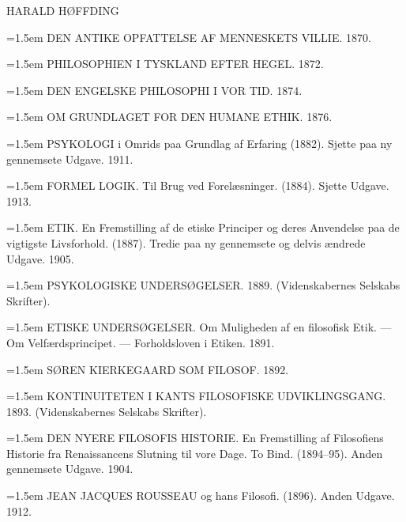 \documentclass[12pt,a4paper,openany]{book}
\begin{document}
\begin{center}
{\large HARALD HØFFDING}
\end{center}
\medskip
\begin{footnotesize}
\setlength{\parindent}{0pt}\setlength{\parskip}{1pt}
\hangindent=1.5em DEN ANTIKE OPFATTELSE AF MENNESKETS VILLIE. 1870.\par
\hangindent=1.5em PHILOSOPHIEN I TYSKLAND EFTER HEGEL. 1872.\par
\hangindent=1.5em DEN ENGELSKE PHILOSOPHI I VOR TID. 1874.\par
\hangindent=1.5em OM GRUNDLAGET FOR DEN HUMANE ETHIK. 1876.\par
\hangindent=1.5em PSYKOLOGI i Omrids paa Grundlag af Erfaring (1882). Sjette paa ny gennemsete Udgave. 1911.\par
\hangindent=1.5em FORMEL LOGIK. Til Brug ved Forelæsninger. (1884). Sjette Udgave. 1913.\par
\hangindent=1.5em ETIK. En Fremstilling af de etiske Principer og deres Anvendelse paa de vigtigste Livsforhold. (1887). Tredie paa ny gennemsete og delvis ændrede Udgave. 1905.\par
\hangindent=1.5em PSYKOLOGISKE UNDERSØGELSER. 1889. (Videnskabernes Selskabs Skrifter).\par
\hangindent=1.5em ETISKE UNDERSØGELSER. Om Muligheden af en filosofisk Etik. --- Om Velfærdsprincipet. --- Forholdsloven i Etiken. 1891.\par
\hangindent=1.5em SØREN KIERKEGAARD SOM FILOSOF. 1892.\par
\hangindent=1.5em KONTINUITETEN I KANTS FILOSOFISKE UDVIKLINGSGANG. 1893. (Videnskabernes Selskabs Skrifter).\par
\hangindent=1.5em DEN NYERE FILOSOFIS HISTORIE. En Fremstilling af Filosofiens Historie fra Renaissancens Slutning til vore Dage. To Bind. (1894--95). Anden gennemsete Udgave. 1904.\par
\hangindent=1.5em JEAN JACQUES ROUSSEAU og hans Filosofi. (1896). Anden Udgave. 1912.\par

\end{footnotesize}
\end{document}
